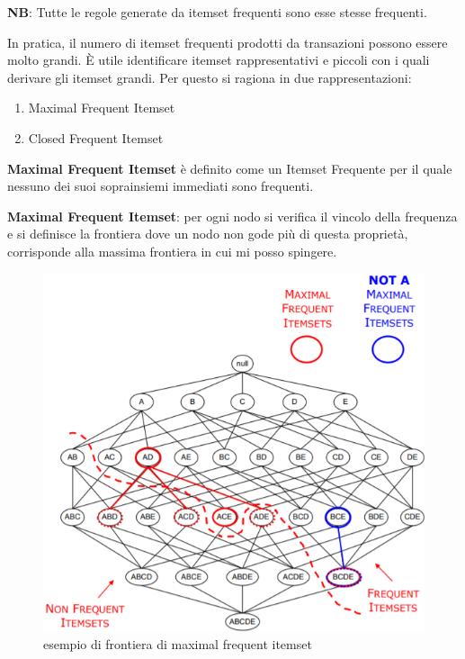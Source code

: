 \textbf{NB}: Tutte le regole generate da itemset frequenti sono esse stesse frequenti.

In pratica, il numero di itemset frequenti prodotti da transazioni possono essere molto grandi. È utile identificare itemset rappresentativi e piccoli con i quali derivare gli itemset grandi. Per questo si ragiona in due rappresentazioni:
\begin{enumerate}
	\item Maximal Frequent Itemset
	\item Closed Frequent Itemset
\end{enumerate}

\begin{defn}
	\textbf{Maximal Frequent Itemset} è definito come un Itemset Frequente per il quale nessuno dei suoi soprainsiemi immediati sono frequenti.
\end{defn}
\textbf{Maximal Frequent Itemset}: per ogni nodo si verifica il vincolo della frequenza e si definisce la frontiera dove un nodo non gode pi\`u di questa propriet\`a, corrisponde alla massima frontiera in cui mi posso spingere.

\begin{figure}[H]
	\centering
	\includegraphics[height=0.7 \linewidth]{association/pict/max_freq_itemset.png}
	\caption{esempio di frontiera di maximal frequent itemset}
\end{figure}

